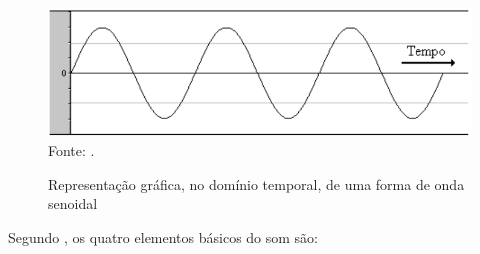 \begin{figure}[!htb]
   \centering
   \caption{Representação gráfica, no domínio temporal, de uma forma de onda senoidal}\label{fig:ondaSenoidal} 
   \includegraphics[scale=0.6]{figuras/ondaSenoidal.png}
   \\Fonte: \cite{miletto2004}.
\end{figure}

Segundo , os quatro elementos básicos do som são:
